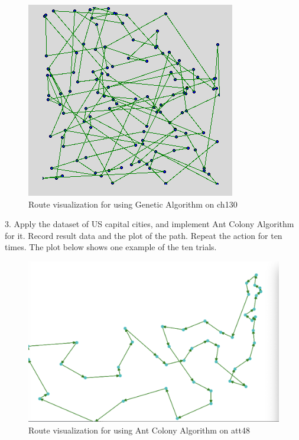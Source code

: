 \documentclass{article}
\begin{document}
\bigskip
\begin{figure}[h]
  \begin{center}
    \includegraphics[scale=0.65]{image6}
  \end{center}
  \caption{Route visualization for using Genetic Algorithm on ch130}
\end{figure}
\bigskip

3. Apply the dataset of US capital cities, and implement Ant Colony Algorithm for it. Record result data and the plot of the path. Repeat the action for ten times. The plot below shows one example of the ten trials.


\bigskip
\begin{figure}[h]
  \begin{center}
    \includegraphics[scale=0.16]{image7}
  \end{center}
  \caption{Route visualization for using Ant Colony Algorithm on att48}
\end{figure}
\bigskip
\end{document}
